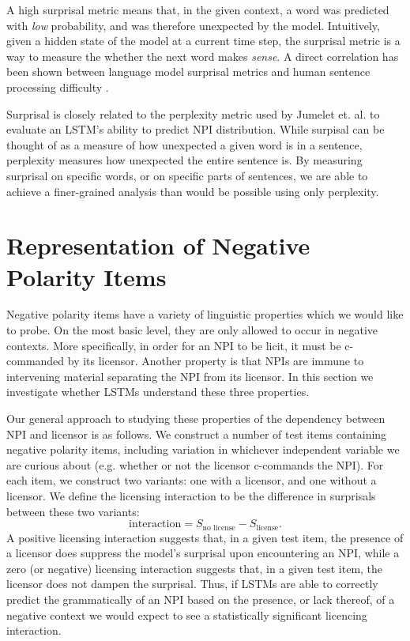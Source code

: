 \documentclass[11pt, round]{article}
\begin{document}
A high surprisal metric means that, in the given context, a word was predicted with \textit{low} probability, and was therefore unexpected by the model. Intuitively, given a hidden state of the model at a current time step, the surprisal metric is a way to measure the whether the next word makes \textit{sense}. A direct correlation has been shown between language model surprisal metrics and  human sentence processing difficulty \cite{hale2001probabilistic,levy2008expectation,smith2013effect}.

Surprisal is closely related to the perplexity metric used by Jumelet et. al.  to evaluate an LSTM's ability to predict NPI distribution. While surpisal can be thought of as a measure of how unexpected a given word is in a sentence, perplexity measures how unexpected the entire sentence is. By measuring surprisal on specific words, or on specific parts of sentences, we are able to achieve a finer-grained analysis than would be possible using only perplexity.

\section{Representation of Negative Polarity Items}

Negative polarity items have a variety of linguistic properties which we would like to probe. On the most basic level, they are only allowed to occur in negative contexts. More specifically, in order for an NPI to be licit, it must be c-commanded by its licensor. Another property is that NPIs are immune to intervening material separating the NPI from its licensor. In this section we  investigate whether LSTMs understand these three properties.

Our general approach to studying these properties of the dependency between NPI and licensor is as follows. We construct a number of test items containing negative polarity items, including variation in whichever independent variable we are curious about (e.g. whether or not the licensor c-commands the NPI). For each item, we construct two variants: one with a licensor, and one without a licensor. We define the licensing interaction to be the difference in surprisals between these two variants:
\[ \textrm{interaction} = S_{\textrm{no license}} - S_{\textrm{license}}. \]
A positive licensing interaction suggests that, in a given test item, the presence of a licensor does suppress the model's surprisal upon encountering an NPI, while a zero (or negative) licensing interaction suggests that, in a given test item, the licensor does not dampen the surprisal. Thus, if LSTMs are able to correctly predict the grammatically of an NPI based on the presence, or lack thereof, of a negative context we would expect to see a statistically significant licencing interaction. 
\end{document}
